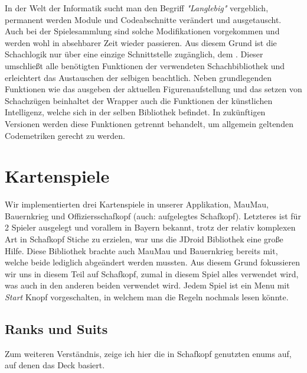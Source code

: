 In der Welt der Informatik sucht man den Begriff \emph{"Langlebig"} vergeblich,
permanent werden Module und Codeabschnitte verändert und ausgetauscht. Auch bei
der Spielesammlung sind solche Modifikationen vorgekommen und werden wohl in
absehbarer Zeit wieder passieren. Aus diesem Grund ist die Schachlogik nur über
eine einzige Schnittstelle zugänglich, dem . Dieser
umschließt alle benötigten Funktionen der verwendeten Schachbibliothek und
erleichtert das Austauschen der selbigen beachtlich. Neben grundlegenden
Funktionen wie das ausgeben der aktuellen Figurenaufstellung und das setzen von
Schachzügen beinhaltet der Wrapper auch die Funktionen der künstlichen
Intelligenz, welche sich in der selben Bibliothek befindet. In zukünftigen
Versionen werden diese Funktionen getrennt behandelt, um allgemein geltenden
Codemetriken gerecht zu werden. 

\section{Kartenspiele}
\sectionauthor{\philipp}
Wir implementierten drei Kartenspiele in unserer Applikation, MauMau, Bauernkrieg und Offiziersschafkopf (auch: aufgelegtes Schafkopf). Letzteres ist für 2 Spieler ausgelegt und vorallem in Bayern bekannt, trotz der relativ komplexen Art in Schafkopf Stiche zu erzielen, war uns die JDroid Bibliothek eine große Hilfe. Diese Bibliothek brachte auch MauMau und Bauernkrieg bereits mit, welche beide lediglich abgeändert werden mussten.
Aus diesem Grund fokussieren wir uns in diesem Teil auf Schafkopf, zumal in diesem Spiel alles verwendet wird, was auch in den anderen beiden verwendet wird.
Jedem Spiel ist ein Menu mit \emph{Start} Knopf vorgeschalten, in welchem man die Regeln nochmals lesen könnte.

\subsection{Ranks und Suits}
Zum weiteren Verständnis, zeige ich hier die in Schafkopf genutzten enums auf, auf denen das Deck basiert.


